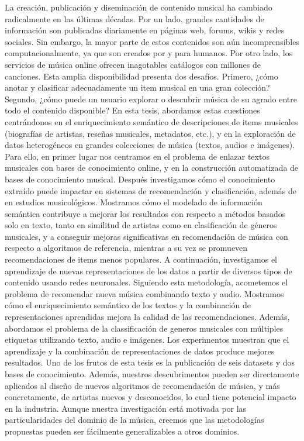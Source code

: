 La creación, publicación y diseminación de contenido musical ha cambiado radicalmente en las últimas décadas. Por un lado, grandes cantidades de información son publicadas diariamente en páginas web, forums, wikis y redes sociales. Sin embargo, la mayor parte de estos contenidos son aún incomprensibles computacionalmente, ya que son creados por y para humanos. Por otro lado, los servicios de música online ofrecen inagotables catálogos con millones de canciones. Esta amplia disponibilidad presenta dos desafíos. Primero, ¿cómo anotar y clasificar adecuadamente un item musical en una gran colección? Segundo, ¿cómo puede un usuario explorar o descubrir música de su agrado entre todo el contenido disponible? En esta tesis, abordamos estas cuestiones centrándonos en el enriquecimiento semántico de descripciones de items musicales (biografías de artistas, reseñas musicales, metadatos, etc.), y en la exploración de datos heterogéneos en grandes colecciones de música (textos, audios e imágenes). Para ello, en primer lugar nos centramos en el problema de enlazar textos musicales con bases de conocimiento online, y en la construcción automatizada de bases de conocimiento musical. Después investigamos cómo el conocimiento extraído puede impactar en sistemas de recomendación y clasificación, además de en estudios musicológicos. Mostramos cómo el modelado de información semántica contribuye a mejorar los resultados con respecto a métodos basados solo en texto, tanto en similitud de artistas como en clasificación de géneros musicales, y a conseguir mejoras significativas en recomendación de música con respecto a algoritmos de referencia, mientras a su vez se promueven recomendaciones de items menos populares. A continuación, investigamos el aprendizaje de nuevas representaciones de los datos a partir de diversos tipos de contenido usando redes neuronales. Siguiendo esta metodología, acometemos el problema de recomendar nueva música combinando texto y audio. Mostramos cómo el enriquecimiento semántico de los textos y la combinación de representaciones aprendidas mejora la calidad de las recomendaciones. Además, abordamos el problema de la classificación de generos musicales con múltiples etiquetas utilizando texto, audio e imágenes. Los experimentos muestran que el aprendizaje y la combinación de representaciones de datos produce mejores resultados. Uno de los frutos de esta tesis es la publicación de seis datasets y dos bases de conocimiento. Además, nuestros descubrimentos pueden ser directamente aplicados al diseño de nuevos algoritmos de recomendación de música, y más concretamente, de artistas nuevos y desconocidos, lo cual tiene potencial impacto en la industria. Aunque nuestra investigación está motivada por las particularidades del dominio de la música, creemos que las metodologías propuestas pueden ser fácilmente generalizables a otros dominios.